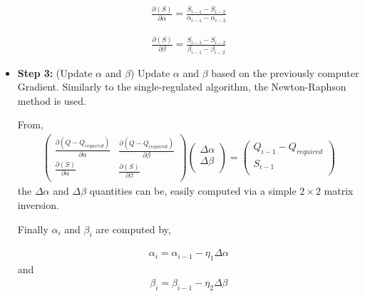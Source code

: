 \begin{itemize}
\begin{eqnarray}
	\frac{\partial(S)}{\partial \alpha}=\frac{S_{i-1}-S_{i-2}}{\alpha_{i-1}- \alpha_{i-2}}
\end{eqnarray}  

\begin{eqnarray}
	\frac{\partial(S)}{\partial \beta}=\frac{S_{i-1}-S_{i-2}}{\beta_{i-1}- \beta_{i-2}}
\end{eqnarray}  

\item[]{\bf Step 3:}  (Update $\alpha$ and $\beta$) Update $\alpha$ and $\beta$ based on the previously computer Gradient.
Similarly to the single-regulated algorithm, the Newton-Raphson method is used.
  
From,  
\begin{eqnarray}
		\left( {\begin{array}{c}
 		\frac{\partial(Q-Q_{required})}{\partial \alpha} \\
 		\frac{\partial(S)}{\partial \alpha}	\\
 		\end{array} } 
 	   {\begin{array}{c}
 		\frac{\partial(Q-Q_{required})}{\partial \beta}  \\
 		\frac{\partial(S)}{\partial \beta}
 		\end{array} } \right)
 		\left( {\begin{array}{c}
 		\Delta \alpha  \\
 		\Delta \beta	\\
 		\end{array} } \right) =
		\left( {\begin{array}{c}
 		Q_{i-1}-Q_{required}  \\
 		S_{i-1}  \\
 		\end{array} } \right)
   \label{cdf-matrix} 
\end{eqnarray}
the $\Delta \alpha$ and $\Delta \beta$ quantities can be, easily computed via a simple $2 \times 2$ matrix inversion.

Finally  $\alpha_i$ and $\beta_i$ are computed by,

\begin{eqnarray}
\alpha_{i}=\alpha_{i-1} - \eta_1 \Delta \alpha  
\end{eqnarray}  
and 
\begin{eqnarray}
\beta_{i}=\beta_{i-1} - \eta_2 \Delta \beta  
\end{eqnarray}  


\end{itemize}
